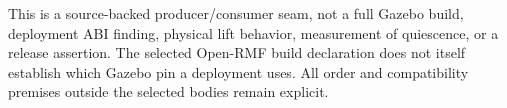 \documentclass[11pt]{article}
\begin{document}
This is a source-backed producer/consumer seam, not a full
Gazebo build, deployment ABI finding, physical lift behavior,
measurement of quiescence, or a release assertion. The selected
Open-RMF build declaration does not itself establish which
Gazebo pin a deployment uses. All order and compatibility
premises outside the selected bodies remain explicit.
\end{document}
